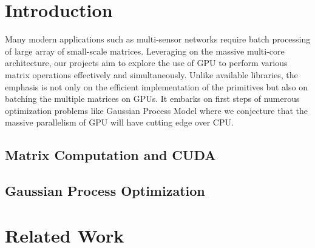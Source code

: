 \documentclass[11pt]{article}
\begin{document}
\maketitle
\tableofcontents

\newpage
\section{Introduction}
Many modern applications such as multi-sensor networks require batch processing of large array of small-scale matrices. Leveraging on the massive multi-core architecture, our projects aim to explore the use of GPU to perform various matrix operations effectively and simultaneously. Unlike available libraries, the emphasis is not only on the efficient implementation of the primitives but also on batching the multiple matrices on GPUs. It embarks on first steps of numerous optimization problems like Gaussian Process Model where we conjecture that the massive parallelism of GPU will have cutting edge over CPU.
\subsection{Matrix Computation and CUDA}
\subsection{Gaussian Process Optimization}

\section{Related Work}
\end{document}
